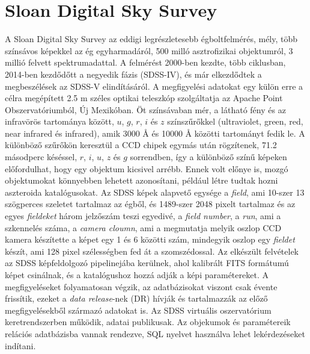 \documentclass[12pt,letterpaper,twoside,openright]{book}
\begin{document}
\section{Sloan Digital Sky Survey}
 A Sloan Digital Sky Survey az eddigi legrészletesebb égboltfelmérés, mély, több színsávos képekkel az ég egyharmadáról, 500 milló asztrofizikai objektumról, 3 millió felvett spektrumadattal. A felmérést 2000-ben kezdte, több ciklusban, 2014-ben kezdődőtt a negyedik fázis (SDSS-IV), és már elkezdődtek a megbeszélések az SDSS-V elindításáról\cite{sdssV}. A megfigyelési adatokat egy külön erre a célra megépített 2.5 m széles optikai teleszkóp szolgáltatja az Apache Point Obszervatóriumból, Új Mexikóban.
 Öt színsávaban mér, a látható fény és az infravörös tartománya között,  $u$, $g$, $r$, $i$ és $z$ színszűrőkkel (ultraviolet, green, red, near infrared és infrared), amik 3000 \AA\text{ }  és 10000 \AA\text{ }  közötti tartományt fedik le. A különböző szűrőkön keresztül a CCD chipek egymás után rögzítenek, 71.2 másodperc késéssel, $r$, $i$, $u$, $z$ és $g$ sorrendben, így a különböző színű képeken előfordulhat, hogy egy objektum kicsivel arrébb. Ennek volt előnye is, mozgó objektumokat könnyebben lehetett azonosítani, például létre tudtak hozni aszteroida katalógusokat. Az SDSS képek alapvető egysége a \textit{field}, ami 10-szer 13 szögperces szeletet tartalmaz az égből, és 1489-szer 2048 pixelt tartalmaz és az egyes \textit{fieldeket} három jelzőszám teszi egyedivé, a \textit{field number},  a \textit{run}, ami a szkennelés száma, a \textit{camera cloumn}, ami a megmutatja melyik oszlop CCD kamera készítette a képet egy 1 és 6 közötti szám, mindegyik oszlop egy \textit{fieldet} készít, ami 128 pixel szélességben fed át a szomszédossal.  Az elkészült felvételek az SDSS képfeldolgozó pipelinejába kerülnek, ahol kalibrált FITS formátumú képet csinálnak, és a katalógushoz hozzá adják a képi paramétereket.
 \newline \indent
 A megfigyeléseket folyamatosan végzik, az adatbázisokat viszont csak évente frissítik, ezeket a \textit{data release}-nek (DR) hívják és tartalmazzák az előző megfigyelésekből származó adatokat is. Az SDSS virtuális oszervatórium keretrendszerben működik, adatai publikusak. Az objekumok és paramétereik relációs adatbázisba vannak rendezve, SQL nyelvet használva lehet lekérdezéseket indítani.
\end{document}
